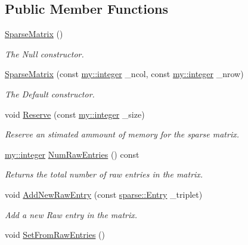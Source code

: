 \subsection*{Public Member Functions}
\begin{DoxyCompactItemize}
\item 
\hyperlink{classmy_1_1SparseMatrix_a6d2ae114334791f63a3e44a96047285f}{Sparse\+Matrix} ()
\begin{DoxyCompactList}\small\item\em The Null constructor. \end{DoxyCompactList}\item 
\hyperlink{classmy_1_1SparseMatrix_a1de5bf243a6a7810cfc1a4395f304067}{Sparse\+Matrix} (const \hyperlink{namespacemy_a42365393c537edae1e89d20ff90d1923}{my\+::integer} \+\_\+ncol, const \hyperlink{namespacemy_a42365393c537edae1e89d20ff90d1923}{my\+::integer} \+\_\+nrow)
\begin{DoxyCompactList}\small\item\em The Default constructor. \end{DoxyCompactList}\item 
void \hyperlink{classmy_1_1SparseMatrix_a9055b71f0d6dbe001608977acf951c60}{Reserve} (const \hyperlink{namespacemy_a42365393c537edae1e89d20ff90d1923}{my\+::integer} \+\_\+size)
\begin{DoxyCompactList}\small\item\em Reserve an stimated ammount of memory for the sparse matrix. \end{DoxyCompactList}\item 
\hyperlink{namespacemy_a42365393c537edae1e89d20ff90d1923}{my\+::integer} \hyperlink{classmy_1_1SparseMatrix_a63704d3902b5640a64a7d25afcd28d85}{Num\+Raw\+Entries} () const 
\begin{DoxyCompactList}\small\item\em Returns the total number of raw entries in the matrix. \end{DoxyCompactList}\item 
void \hyperlink{classmy_1_1SparseMatrix_a99dd255132d7af8e313723f91f08cf80}{Add\+New\+Raw\+Entry} (const \hyperlink{namespacesparse_a841919761b2e35cc4d59f636ab10a07b}{sparse\+::\+Entry} \+\_\+triplet)
\begin{DoxyCompactList}\small\item\em Add a new Raw entry in the matrix. \end{DoxyCompactList}\item 
void \hyperlink{classmy_1_1SparseMatrix_a1f3d02071e55da946a9a26a65615aa8f}{Set\+From\+Raw\+Entries} ()

\end{DoxyCompactItemize}
